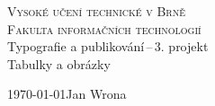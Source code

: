 \begin{titlepage}
\begin{center}
\textsc{{\Huge Vysoké učení technické v Brně}\\
\medskip
{\huge Fakulta informačních technologií}}\\
{\LARGE Typografie a publikování\,--\,3. projekt}\\
\medskip
{\Huge Tabulky a obrázky}\\
\end{center}
{\Large \today \hfill Jan Wrona}
\end{titlepage}
